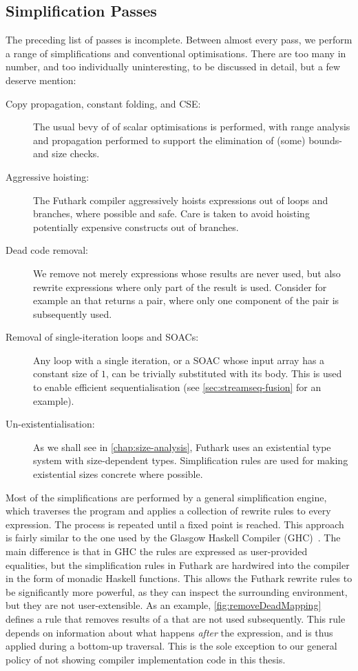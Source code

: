 \subsection{Simplification Passes}

The preceding list of passes is incomplete.  Between almost every
pass, we perform a range of simplifications and conventional
optimisations.  There are too many in number, and too individually
uninteresting, to be discussed in detail, but a few deserve mention:

\begin{description}
\item[Copy propagation, constant folding, and CSE:] The usual bevy of
  of scalar optimisations is performed, with range analysis and
  propagation performed to support the elimination of (some) bounds-
  and size checks.
\item[Aggressive hoisting:] The Futhark compiler aggressively hoists
  expressions out of loops and branches, where possible and safe.
  Care is taken to avoid hoisting potentially expensive constructs out
  of branches.
\item[Dead code removal:] We remove not merely expressions whose
  results are never used, but also rewrite expressions where only part
  of the result is used.  Consider for example an  that returns
  a pair, where only one component of the pair is subsequently used.
\item[Removal of single-iteration loops and SOACs:] Any loop with a
  single iteration, or a SOAC whose input array has a constant size of
  $1$, can be trivially substituted with its body.  This is used to
  enable efficient sequentialisation (see \cref{sec:streamseq-fusion}
  for an example).
\item[Un-existentialisation:] As we shall see in
  \cref{chap:size-analysis}, Futhark uses an existential type system
  with size-dependent types.  Simplification rules are used for making
  existential sizes concrete where possible.
\end{description}

Most of the simplifications are performed by a general simplification
engine, which traverses the program and applies a collection of
rewrite rules to every expression.  The process is repeated until a
fixed point is reached.  This approach is fairly similar to the one
used by the Glasgow Haskell Compiler (GHC)~\cite{jones2001playing}.
The main difference is that in GHC the rules are expressed as
user-provided equalities, but the simplification rules in Futhark are
hardwired into the compiler in the form of monadic Haskell functions.
This allows the Futhark rewrite rules to be significantly more
powerful, as they can inspect the surrounding environment, but they
are not user-extensible.  As an example, \cref{fig:removeDeadMapping}
defines a rule that removes results of a  that are not used
subsequently.  This rule depends on information about what happens
\textit{after} the expression, and is thus applied during a bottom-up
traversal.  This is the sole exception to our general policy of not
showing compiler implementation code in this thesis.


